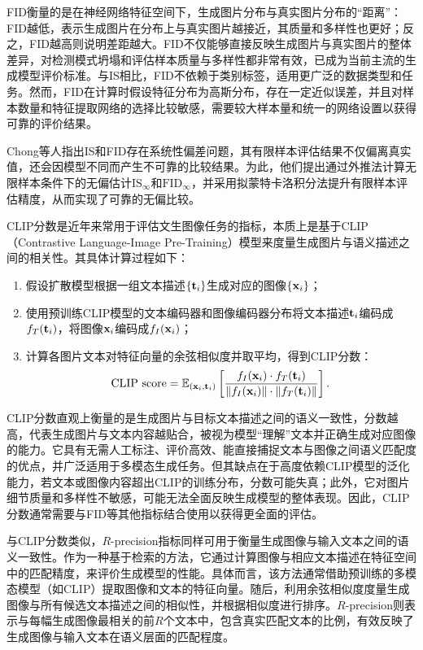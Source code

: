 \documentclass[11pt,a4paper,UTF8]{ctexart}
\begin{document}
FID衡量的是在神经网络特征空间下，生成图片分布与真实图片分布的“距离”：FID越低，表示生成图片在分布上与真实图片越接近，其质量和多样性也更好；反之，FID越高则说明差距越大。FID不仅能够直接反映生成图片与真实图片的整体差异，对检测模式坍塌和评估样本质量与多样性都非常有效，已成为当前主流的生成模型评价标准。与IS相比，FID不依赖于类别标签，适用更广泛的数据类型和任务。然而，FID在计算时假设特征分布为高斯分布，存在一定近似误差，并且对样本数量和特征提取网络的选择比较敏感，需要较大样本量和统一的网络设置以获得可靠的评价结果。

Chong等人\cite{chong2020effectively}指出IS和FID存在系统性偏差问题，其有限样本评估结果不仅偏离真实值，还会因模型不同而产生不可靠的比较结果。为此，他们提出通过外推法计算无限样本条件下的无偏估计$\text{IS}_\infty$和$\text{FID}_\infty$，并采用拟蒙特卡洛积分法提升有限样本评估精度，从而实现了可靠的无偏比较。

CLIP分数是近年来常用于评估文生图像任务的指标，本质上是基于CLIP（Contrastive Language-Image Pre-Training）\cite{radford2021learning}模型来度量生成图片与语义描述之间的相关性。其具体计算过程如下：
\begin{tcolorbox}
\begin{enumerate}
    \item 假设扩散模型根据一组文本描述$\{\mathbf{t}_i\}$生成对应的图像$\{\mathbf{x}_i\}$；
    \item 使用预训练CLIP模型的文本编码器和图像编码器分布将文本描述$\mathbf{t}_i$编码成$f_T(\mathbf{t}_i)$，将图像$\mathbf{x}_i$编码成$f_I(\mathbf{x}_i)$；
    \item 计算各图片文本对特征向量的余弦相似度并取平均，得到CLIP分数：
    \begin{equation*}
    \text{CLIP score}=\mathbb{E}_{(\mathbf{x}_i,\mathbf{t}_i)}\left[\frac{f_I(\mathbf{x}_i)\cdot f_T(\mathbf{t}_i)}{\|f_I(\mathbf{x}_i)\|\cdot\|f_T(\mathbf{t}_i)\|}\right].
    \end{equation*}  
\end{enumerate}
\end{tcolorbox}

CLIP分数直观上衡量的是生成图片与目标文本描述之间的语义一致性，分数越高，代表生成图片与文本内容越贴合，被视为模型“理解”文本并正确生成对应图像的能力。它具有无需人工标注、评价高效、能直接捕捉文本与图像之间语义匹配度的优点，并广泛适用于多模态生成任务。但其缺点在于高度依赖CLIP模型的泛化能力，若文本或图像内容超出CLIP的训练分布，分数可能失真；此外，它对图片细节质量和多样性不敏感，可能无法全面反映生成模型的整体表现。因此，CLIP分数通常需要与FID等其他指标结合使用以获得更全面的评估。

与CLIP分数类似，$R$-precision指标\cite{xu2018attngan}同样可用于衡量生成图像与输入文本之间的语义一致性。作为一种基于检索的方法，它通过计算图像与相应文本描述在特征空间中的匹配精度，来评价生成模型的性能。具体而言，该方法通常借助预训练的多模态模型（如CLIP）提取图像和文本的特征向量。随后，利用余弦相似度度量生成图像与所有候选文本描述之间的相似性，并根据相似度进行排序。$R$-precision则表示与每幅生成图像最相关的前$R$个文本中，包含真实匹配文本的比例，有效反映了生成图像与输入文本在语义层面的匹配程度。
\end{document}

